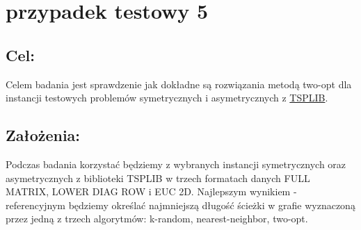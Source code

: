 \section{przypadek testowy 5}
\subsection{Cel: }
Celem badania jest sprawdzenie jak dokładne są rozwiązania metodą two-opt dla instancji testowych problemów symetrycznych i asymetrycznych z \href{http://comopt.ifi.uni-heidelberg.de/software/TSPLIB95/}{TSPLIB}.
\subsection{Założenia: }
Podczas badania korzystać będziemy z wybranych instancji symetrycznych oraz asymetrycznych z biblioteki TSPLIB w trzech formatach danych FULL MATRIX, LOWER DIAG ROW i EUC 2D. Najlepszym wynikiem - referencyjnym będziemy określać najmniejszą długość ścieżki w grafie wyznaczoną przez jedną z trzech algorytmów: k-random, nearest-neighbor, two-opt.

